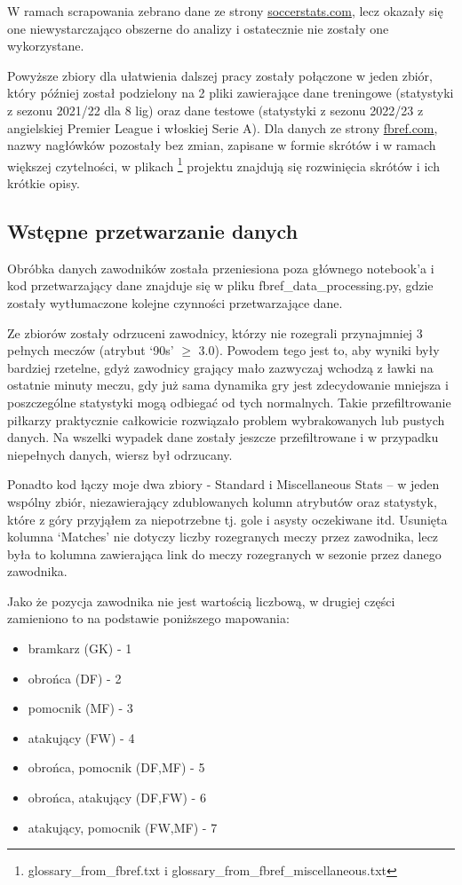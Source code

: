 \documentclass{article}
\begin{document}
W ramach scrapowania zebrano dane ze strony \href{https://www.soccerstats247.com/}{soccerstats.com}, lecz okazały się one niewystarczająco obszerne do analizy i ostatecznie nie zostały one wykorzystane.

Powyższe zbiory dla ułatwienia dalszej pracy zostały połączone w jeden zbiór, który później został podzielony na 2 pliki zawierające dane treningowe (statystyki z sezonu 2021/22 dla 8 lig) oraz dane testowe (statystyki z sezonu 2022/23 z angielskiej Premier League i włoskiej Serie A). 
Dla danych ze strony \href{https://fbref.com/en/}{fbref.com}, nazwy nagłówków pozostały bez zmian, zapisane w formie skrótów i w ramach większej czytelności, w plikach \footnote{glossary\_from\_fbref.txt i glossary\_from\_fbref\_miscellaneous.txt} projektu znajdują się rozwinięcia skrótów i ich krótkie opisy.


\subsection{Wstępne przetwarzanie danych}

Obróbka danych zawodników została przeniesiona poza głównego notebook’a i kod przetwarzający dane znajduje się w pliku fbref\_data\_processing.py, gdzie zostały wytłumaczone kolejne czynności przetwarzające dane.

Ze zbiorów zostały odrzuceni zawodnicy, którzy nie rozegrali przynajmniej 3 pełnych meczów (atrybut ‘90s’ $ \geq $ 3.0). Powodem tego jest to, aby wyniki były bardziej rzetelne, gdyż zawodnicy grający mało  zazwyczaj wchodzą z ławki na ostatnie minuty meczu, gdy już sama dynamika gry jest zdecydowanie mniejsza i poszczególne statystyki mogą odbiegać od tych normalnych. Takie przefiltrowanie piłkarzy praktycznie całkowicie rozwiązało problem wybrakowanych lub pustych danych.
Na wszelki wypadek dane zostały jeszcze przefiltrowane i w przypadku niepełnych danych, wiersz był odrzucany.

Ponadto kod łączy moje dwa zbiory - Standard i Miscellaneous Stats – w jeden wspólny zbiór, niezawierający zdublowanych kolumn atrybutów oraz statystyk, które z góry przyjąłem za niepotrzebne tj. gole i asysty oczekiwane itd. Usunięta kolumna ‘Matches’ nie dotyczy liczby rozegranych meczy przez zawodnika, lecz była to kolumna zawierająca link do meczy rozegranych w sezonie przez danego zawodnika.

Jako że pozycja zawodnika nie jest wartością liczbową, w drugiej części zamieniono to na podstawie poniższego mapowania:
\begin{itemize}
    \item bramkarz (GK) - 1
    \item obrońca (DF) - 2
    \item pomocnik (MF) - 3
    \item atakujący (FW) - 4
    \item obrońca, pomocnik (DF,MF) - 5
    \item obrońca, atakujący (DF,FW) - 6
    \item atakujący, pomocnik (FW,MF) - 7
\end{itemize}
\end{document}
